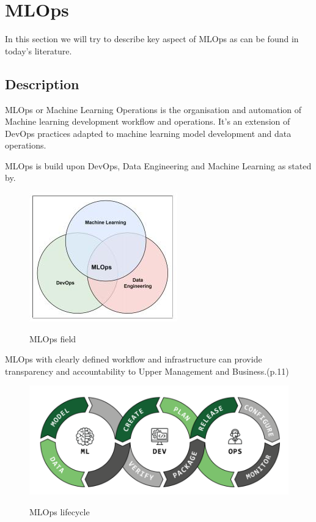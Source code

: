 \section{MLOps}\label{sec:mlops}

In this section we will try to describe key aspect of MLOps as can be found in today's literature.

\subsection{Description}\label{subsec:description}
MLOps or Machine Learning Operations is the organisation and automation of Machine learning development workflow and operations.
It's an extension of DevOps practices adapted to machine learning model development and data operations\cite{Kreuzberger2022MachineLO}.

MLOps is build upon DevOps, Data Engineering and Machine Learning as stated by\cite{9792270}.

\begin{figure}[!htbp]
    \caption{MLOps field\cite{9792270}}
    \centering
    \includegraphics[scale=0.5]{images/ml-dev-data-ops}
    \label{fig:ml-dev-data-ops}
\end{figure}


MLOps with clearly defined workflow and infrastructure can provide transparency and accountability to Upper Management and Business.\cite{treveil2020introducing}(p.11)

\begin{figure}[!htbp]
    \caption{MLOps lifecycle\cite{mlops-definition-tools-and-challenge}}
    \centering
    \includegraphics[scale=0.5]{images/ml-dev-ops}
    \label{fig:ml-dev-ops}
\end{figure}

